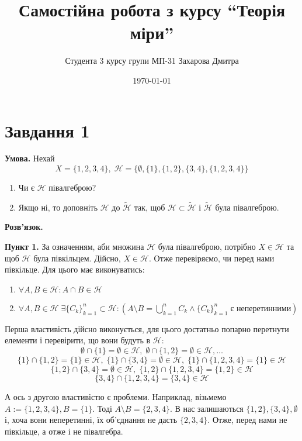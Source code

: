 \documentclass[12pt]{extarticle}
\title{Самостійна робота з курсу ``Теорія міри''}
\author{Студента 3 курсу групи МП-31 Захарова Дмитра}
\date{\today}
\begin{document}
\maketitle

\section*{Завдання 1}

\textbf{Умова.} Нехай
\[
X = \{1,2,3,4\}, \; \mathcal{H} = \{\emptyset, \{1\}, \{1,2\}, \{3,4\}, \{1, 2, 3, 4\}\}
\]

\begin{enumerate}
    \item Чи є $\mathcal{H}$ півалгеброю?
    \item Якщо ні, то доповніть $\mathcal{H}$ до $\widetilde{\mathcal{H}}$ так, щоб $\mathcal{H} \subset \widetilde{\mathcal{H}}$ і $\widetilde{\mathcal{H}}$ була півалгеброю.
\end{enumerate}

\textbf{Розвʼязок.} 

\textbf{Пункт 1.} За означенням, аби множина $\mathcal{H}$ була півалгеброю, потрібно $X \in \mathcal{H}$ та щоб $\mathcal{H}$ була півкільцем. Дійсно, $X \in \mathcal{H}$. Отже перевіряємо, чи перед нами півкільце. Для цього має виконуватись:
\begin{enumerate}
    \item $\forall A,B \in \mathcal{H}: A \cap B \in \mathcal{H}$
    \item $\forall A,B \in \mathcal{H} \; \exists \{C_k\}_{k=1}^n \subset \mathcal{H}: (A \setminus B = \bigcup_{k=1}^n C_k \wedge \{C_k\}_{k=1}^n \;\text{є неперетинними})$
\end{enumerate}

Перша властивість дійсно виконується, для цього достатньо попарно перетнути елементи і перевірити, що вони будуть в $\mathcal{H}$:
\[
\emptyset \cap \{1\} = \emptyset \in \mathcal{H},\; \emptyset \cap \{1,2\} = \emptyset \in \mathcal{H}, \dots
\]
\[
\{1\} \cap \{1,2\} = \{1\} \in \mathcal{H}, \; \{1\} \cap \{3,4\} = \emptyset \in \mathcal{H}, \; \{1\} \cap \{1,2,3,4\} = \{1\} \in \mathcal{H}
\]
\[
\{1,2\} \cap \{3,4\} = \emptyset \in \mathcal{H}, \; \{1,2\} \cap \{1,2,3,4\} = \{1,2\} \in \mathcal{H}
\]
\[
\{3,4\} \cap \{1,2,3,4\} = \{3,4\} \in \mathcal{H}
\]

А ось з другою властивістю є проблеми. Наприклад, візьмемо $A:=\{1,2,3,4\}, B=\{1\}$. Тоді $A \setminus B = \{2,3,4\}$. В нас залишаються $\{1,2\},\{3,4\}, \emptyset$ і, хоча вони неперетинні, їх об'єднання не дасть $\{2,3,4\}$. Отже, перед нами не півкільце, а отже і не півалгебра.
\end{document}
